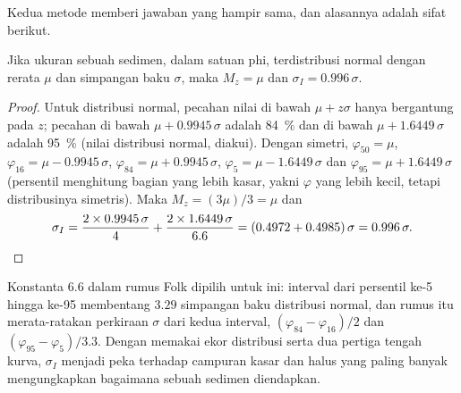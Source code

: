 Kedua metode memberi jawaban yang hampir sama, dan alasannya adalah sifat berikut.

\begin{proposition}\label{prop:b1:clastic-sediments:normal}
Jika ukuran sebuah sedimen, dalam satuan phi, terdistribusi normal dengan rerata $\mu$ dan simpangan baku $\sigma$, maka $M_z = \mu$ dan $\sigma_I = 0.996\,\sigma$.
\end{proposition}

\begin{proof}
Untuk distribusi normal, pecahan nilai di bawah $\mu + z\sigma$ hanya bergantung pada $z$; pecahan di bawah $\mu + 0.9945\,\sigma$ adalah \qty{84}{\percent}
dan di bawah $\mu + 1.6449\,\sigma$ adalah \qty{95}{\percent} (nilai distribusi normal, diakui). Dengan simetri, $\varphi_{50} = \mu$, $\varphi_{16} = \mu -
0.9945\,\sigma$, $\varphi_{84} = \mu + 0.9945\,\sigma$, $\varphi_5 = \mu -
1.6449\,\sigma$ dan $\varphi_{95} = \mu + 1.6449\,\sigma$ (persentil menghitung bagian yang lebih kasar, yakni $\varphi$ yang lebih kecil, tetapi distribusinya
simetris). Maka $M_z = (3\mu)/3 = \mu$ dan
\[
  \sigma_I = \frac{2 \times 0.9945\,\sigma}{4} + \frac{2 \times 1.6449\,\sigma}{6.6}
  = (0.4972 + 0.4985)\,\sigma = 0.996\,\sigma. \qedhere
\]
\end{proof}

Konstanta 6.6 dalam rumus Folk dipilih untuk ini: interval dari persentil ke-5 hingga ke-95 membentang $3.29$ simpangan baku distribusi normal, dan rumus itu merata-ratakan perkiraan $\sigma$ dari kedua interval, $(\varphi_{84}-\varphi_{16})/2$ dan $(\varphi_{95}-\varphi_5)/3.3$. Dengan memakai ekor distribusi serta dua pertiga tengah kurva, $\sigma_I$ menjadi peka terhadap campuran kasar dan halus yang paling banyak mengungkapkan bagaimana sebuah sedimen diendapkan.

